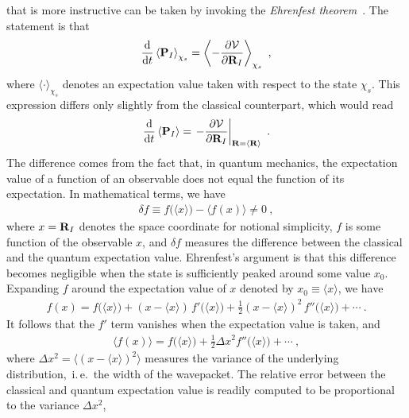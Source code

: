  that is more instructive can be taken by invoking the \emph{Ehrenfest theorem}~\cite{Ehrenfest1927,Basdevant2007}. The statement is that
\begin{align}
\frac{\d}{\d t} \left\langle {\bf P}_I \right\rangle_{\chi_s}
= \left\langle
- \frac{\partial \mathcal{V}}{\partial {\bf R}_I}
\right\rangle_{\chi_s}~,
\label{eq:ehrenfest.de1}
\end{align}
where $\langle \cdot \rangle_{\chi_s}$ denotes an expectation value taken with respect to the state $\chi_s$. This expression differs only slightly from the classical counterpart, which would read
\begin{align}
\frac{\d}{\d t} \left\langle {\bf P}_I \right\rangle
= \left.
- \frac{\partial \mathcal{V}}{\partial {\bf R}_I}
\right\vert_{{\bf R} = \langle {\bf R} \rangle}~.
\label{eq:ehrenfest.de2}
\end{align}
The difference comes from the fact that, in quantum mechanics, the expectation value of a function of an observable does not equal the function of its expectation. In mathematical terms, we have
\begin{align}
\delta f  \equiv 
f \bm ( \langle x \rangle \bm{)} 
- 
\bm{\langle} f (x) \bm{\rangle}
\neq 0
~,
\label{eq:ehrenfest.delta1}
\end{align}
where $x = {\bf R}_I$ denotes the space coordinate for notional simplicity, $f$ is some function of the observable $x$, and $\delta f$ measures the difference between the classical and the quantum expectation value. Ehrenfest's argument is that this difference becomes negligible when the state is sufficiently peaked around some value $x_0$. Expanding $f$ around the expectation value of $x$ denoted by $x_0 \equiv \langle x \rangle$, we have
\begin{align}
f(x) = f \bm ( \langle x \rangle \bm{)}  
+ (x - \langle x \rangle) \, f' \bm ( \langle x \rangle \bm{)}
+ \frac{1}{2} (x - \langle x \rangle)^2 \, f'' \bm ( \langle x \rangle \bm{)}
+ \cdots~.
\label{eq:ehrenfest.f2}
\end{align}
It follows that the $f'$ term vanishes when the expectation value is taken, and
\begin{align}
\langle f(x) \rangle 
= f \bm ( \langle x \rangle \bm{)}  
+ \frac{1}{2} \Delta x^2 f'' \bm ( \langle x \rangle \bm{)}
+ \cdots~,
\label{eq:ehrenfest.f3}
\end{align}
where $\Delta x^2 = \bm{\langle} (x - \langle x \rangle)^2 \bm{\rangle}$ measures the variance of the underlying distribution,~i.\,e.~the width of the wavepacket. The relative error between the classical and quantum expectation value is readily computed to be proportional to the variance $\Delta x^2$,
